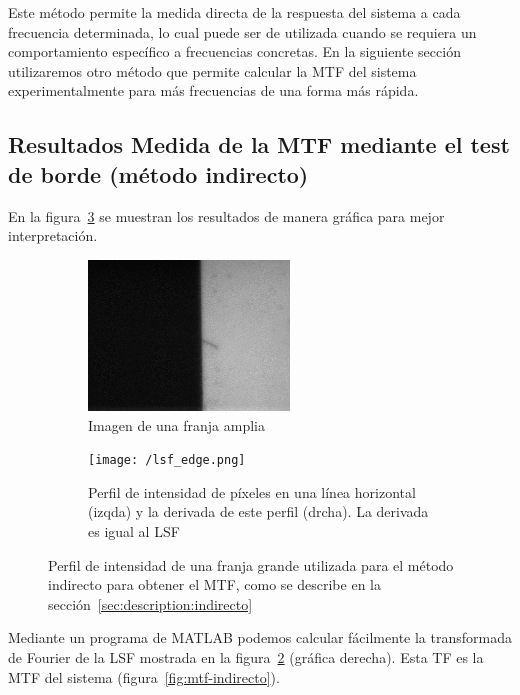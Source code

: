\documentclass{./packages/optica-article}
\begin{document}
Este método permite la medida directa de la respuesta del sistema a cada frecuencia determinada, lo cual puede ser de utilizada cuando se requiera un comportamiento específico a frecuencias concretas. En la siguiente sección utilizaremos otro método que permite calcular la MTF del sistema experimentalmente para más frecuencias de una forma más rápida.





\subsection{Resultados Medida de la MTF mediante el test de borde (método indirecto)}\label{sec:resultados:indirecto}


En la figura~\ref{fig:perfil} se muestran los resultados de manera gráfica para mejor interpretación.
\begin{figure}[hptb]
	\centering
	\begin{subfigure}[t]{0.35\textwidth}
		\centering
		\includegraphics[height=4cm]{edge_large_line}
		\caption{Imagen de una franja amplia}\label{fig:perfil:img}
	\end{subfigure}
	\quad
	\begin{subfigure}[t]{0.60\textwidth}
		\centering
		\texttt{[image: /lsf\_edge.png]}
		\caption{Perfil de intensidad de píxeles en una línea horizontal (izqda) y la derivada de este perfil (drcha). La derivada es igual al LSF}\label{fig:perfil:graph}
	\end{subfigure}
	\caption{Perfil de intensidad de una franja grande utilizada para el método indirecto para obtener el MTF, como se describe en la sección~\ref{sec:description:indirecto}}\label{fig:perfil}
\end{figure}

Mediante un programa de MATLAB podemos calcular fácilmente la transformada de Fourier de la LSF mostrada en la figura~\ref{fig:perfil:graph} (gráfica derecha). Esta TF es la MTF del sistema (figura~\ref{fig:mtf-indirecto}).
\end{document}
